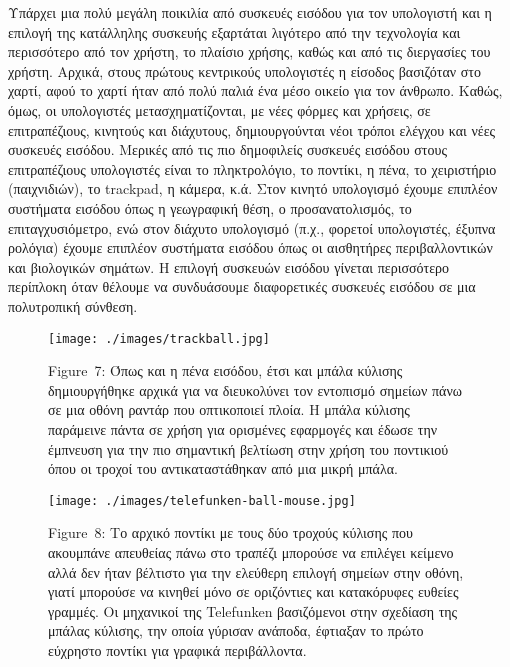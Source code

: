 \documentclass[
]{article}
\begin{document}
Υπάρχει μια πολύ μεγάλη ποικιλία από συσκευές εισόδου για τον υπολογιστή
και η επιλογή της κατάλληλης συσκευής εξαρτάται λιγότερο από την
τεχνολογία και περισσότερο από τον χρήστη, το πλαίσιο χρήσης, καθώς και
από τις διεργασίες του χρήστη. Αρχικά, στους πρώτους κεντρικούς
υπολογιστές η είσοδος βασιζόταν στο χαρτί, αφού το χαρτί ήταν από πολύ
παλιά ένα μέσο οικείο για τον άνθρωπο. Καθώς, όμως, οι υπολογιστές
μετασχηματίζονται, με νέες φόρμες και χρήσεις, σε επιτραπέζιους,
κινητούς και διάχυτους, δημιουργούνται νέοι τρόποι ελέγχου και νέες
συσκευές εισόδου. Μερικές από τις πιο δημοφιλείς συσκευές εισόδου στους
επιτραπέζιους υπολογιστές είναι το πληκτρολόγιο, το ποντίκι, η πένα, το
χειριστήριο (παιχνιδιών), το trackpad, η κάμερα, κ.ά. Στον κινητό
υπολογισμό έχουμε επιπλέον συστήματα εισόδου όπως η γεωγραφική θέση, ο
προσανατολισμός, το επιταγχυσιόμετρο, ενώ στον διάχυτο υπολογισμό (π.χ.,
φορετοί υπολογιστές, έξυπνα ρολόγια) έχουμε επιπλέον συστήματα εισόδου
όπως οι αισθητήρες περιβαλλοντικών και βιολογικών σημάτων. Η επιλογή
συσκευών εισόδου γίνεται περισσότερο περίπλοκη όταν θέλουμε να
συνδυάσουμε διαφορετικές συσκευές εισόδου σε μια πολυτροπική σύνθεση.

\leavevmode{}%
\begin{figure}
\hypertarget{fig:trackball}{%
\centering
\texttt{[image: ./images/trackball.jpg]}
\caption{Figure~7: Όπως και η πένα εισόδου, έτσι και μπάλα κύλισης
δημιουργήθηκε αρχικά για να διευκολύνει τον εντοπισμό σημείων πάνω σε
μια οθόνη ραντάρ που οπτικοποιεί πλοία. Η μπάλα κύλισης παράμεινε πάντα
σε χρήση για ορισμένες εφαρμογές και έδωσε την έμπνευση για την πιο
σημαντική βελτίωση στην χρήση του ποντικιού όπου οι τροχοί του
αντικαταστάθηκαν από μια μικρή μπάλα.}\label{fig:trackball}
}
\end{figure}

\leavevmode{}%
\begin{figure}
\hypertarget{fig:telefunken-ball-mouse}{%
\centering
\texttt{[image: ./images/telefunken-ball-mouse.jpg]}
\caption{Figure~8: Το αρχικό ποντίκι με τους δύο τροχούς κύλισης που
ακουμπάνε απευθείας πάνω στο τραπέζι μπορούσε να επιλέγει κείμενο αλλά
δεν ήταν βέλτιστο για την ελεύθερη επιλογή σημείων στην οθόνη, γιατί
μπορούσε να κινηθεί μόνο σε οριζόντιες και κατακόρυφες ευθείες γραμμές.
Οι μηχανικοί της Telefunken βασιζόμενοι στην σχεδίαση της μπάλας
κύλισης, την οποία γύρισαν ανάποδα, έφτιαξαν το πρώτο εύχρηστο ποντίκι
για γραφικά περιβάλλοντα.}\label{fig:telefunken-ball-mouse}
}
\end{figure}
\end{document}
